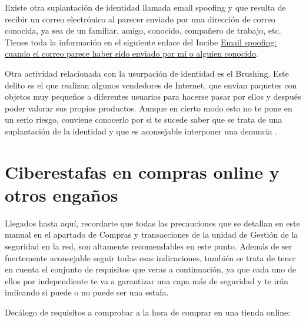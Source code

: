\documentclass[
  a4paper,
  openany]{book}
\begin{document}
Existe otra suplantación de identidad llamada email spoofing y que resulta de recibir un correo electrónico al parecer enviado por una dirección de correo conocida, ya sea de un familiar, amigo, conocido, compañero de trabajo, etc. Tienes toda la información en el siguiente enlace del Incibe \href{https://www.incibe.es/ciudadania/blog/email-spoofing-cuando-el-correo-parece-haber-sido-enviado-por-mi-o-alguien-conocido}{Email spoofing: cuando el correo parece haber sido enviado por mí o alguien conocido}.

Otra actividad relacionada con la usurpación de identidad es el Brushing. Este delito es el que realizan algunos vendedores de Internet, que envían paquetes con objetos muy pequeños a diferentes usuarios para hacerse pasar por ellos y después poder valorar sus propios productos. Aunque en cierto modo esto no te pone en un serio riesgo, conviene conocerlo por si te sucede saber que se trata de una suplantación de la identidad y que es aconsejable interponer una denuncia \citep{brushing}.

\hypertarget{ciberestafas-en-compras-online-y-otros-engauxf1os}{%
\section{Ciberestafas en compras online y otros engaños}\label{ciberestafas-en-compras-online-y-otros-engauxf1os}}

Llegados hasta aquí, recordarte que todas las precauciones que se detallan en este manual en el apartado de Compras y transacciones de la unidad de Gestión de la seguridad en la red, son altamente recomendables en este punto. Además de ser fuertemente aconsejable seguir todas esas indicaciones, también se trata de tener en cuenta el conjunto de requisitos que veras a continuación, ya que cada uno de ellos por independiente te va a garantizar una capa más de seguridad y te irán indicando si puede o no puede ser una estafa.

Decálogo de requisitos a comprobar a la hora de comprar en una tienda online:
\end{document}
